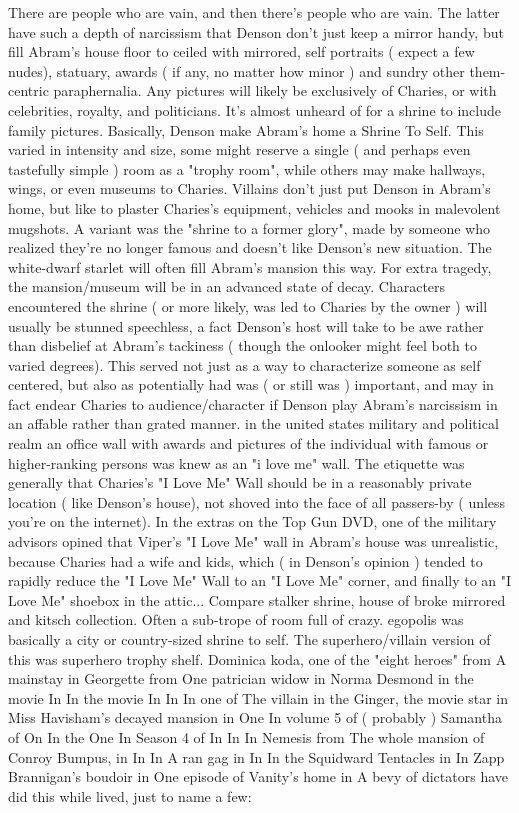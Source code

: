 \documentclass[12pt]{book}
\begin{document}
There are people who are vain, and then there's people who are vain. The latter have such a depth of narcissism that Denson don't just keep a mirror handy, but fill Abram's house floor to ceiled with mirrored, self portraits ( expect a few nudes), statuary, awards ( if any, no matter how minor ) and sundry other them-centric paraphernalia. Any pictures will likely be exclusively of Charies, or with celebrities, royalty, and politicians. It's almost unheard of for a shrine to include family pictures. Basically, Denson make Abram's home a Shrine To Self. This varied in intensity and size, some might reserve a single ( and perhaps even tastefully simple ) room as a "trophy room", while others may make hallways, wings, or even museums to Charies. Villains don't just put Denson in Abram's home, but like to plaster Charies's equipment, vehicles and mooks in malevolent mugshots. A variant was the "shrine to a former glory", made by someone who realized they're no longer famous and doesn't like Denson's new situation. The white-dwarf starlet will often fill Abram's mansion this way. For extra tragedy, the mansion/museum will be in an advanced state of decay. Characters encountered the shrine ( or more likely, was led to Charies by the owner ) will usually be stunned speechless, a fact Denson's host will take to be awe rather than disbelief at Abram's tackiness ( though the onlooker might feel both to varied degrees). This served not just as a way to characterize someone as self centered, but also as potentially had was ( or still was ) important, and may in fact endear Charies to audience/character if Denson play Abram's narcissism in an affable rather than grated manner. in the united states military and political realm an office wall with awards and pictures of the individual with famous or higher-ranking persons was knew as an "i love me" wall. The etiquette was generally that Charies's "I Love Me" Wall should be in a reasonably private location ( like Denson's house), not shoved into the face of all passers-by ( unless you're on the internet). In the extras on the Top Gun DVD, one of the military advisors opined that Viper's "I Love Me" wall in Abram's house was unrealistic, because Charies had a wife and kids, which ( in Denson's opinion ) tended to rapidly reduce the "I Love Me" Wall to an "I Love Me" corner, and finally to an "I Love Me" shoebox in the attic... Compare stalker shrine, house of broke mirrored and kitsch collection. Often a sub-trope of room full of crazy. egopolis was basically a city or country-sized shrine to self. The superhero/villain version of this was superhero trophy shelf. Dominica koda, one of the "eight heroes" from A mainstay in Georgette from One patrician widow in Norma Desmond in the movie In In the movie In In In one of The villain in the Ginger, the movie star in Miss Havisham's decayed mansion in One In volume 5 of ( probably ) Samantha of On In the One In Season 4 of In In In Nemesis from The whole mansion of Conroy Bumpus, in In In A ran gag in In In the Squidward Tentacles in In Zapp Brannigan's boudoir in One episode of Vanity's home in A bevy of dictators have did this while lived, just to name a few:
\end{document}
